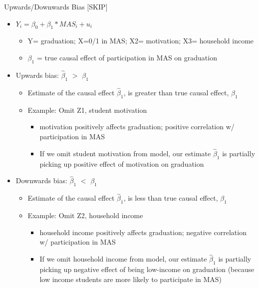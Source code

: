 \begin{frame}[shrink=10]{Upwards/Downwards Bias [SKIP]}
	\begin{itemize}
	\item $Y_{i} = \beta_{0} + \beta_{1}* MAS_{i} + u_{i}$
		\begin{itemize}
		\item Y= graduation; X=0/1 in MAS; X2= motivation; X3= household income
		\item $\beta_{1}$ = true causal effect of participation in MAS on graduation
		\end{itemize}	
	\item	Upwards bias: $\hat{\beta}_{1}$   $>$   $\beta_{1}$
		\begin{itemize}
		\item Estimate of the causal effect $\hat{\beta}_{1}$, is greater than true causal effect,  $\beta_{1}$
		\item Example: Omit Z1, student motivation
			\begin{itemize}
			\item motivation positively affects graduation; positive correlation w/ participation in MAS
			\item If we omit student motivation from model, our estimate $\hat{\beta}_{1}$ is partially picking up positive effect of motivation on graduation
			\end{itemize}
		\end{itemize}
	\item	Downwards bias: $\hat{\beta}_{1}$   $<$   $\beta_{1}$
		\begin{itemize}
		\item Estimate of the causal effect $\hat{\beta}_{1}$, is less than true causal effect,  $\beta_{1}$
		\item Example: Omit Z2, household income
			\begin{itemize}
			\item household income positively affects graduation; negative correlation w/ participation in MAS
			\item If we omit household income from model, our estimate $\hat{\beta}_{1}$ is partially picking up negative effect of being low-income on graduation (because low income students are more likely to participate in MAS)
			\end{itemize}
		\end{itemize}
	\end{itemize}
\end{frame}

